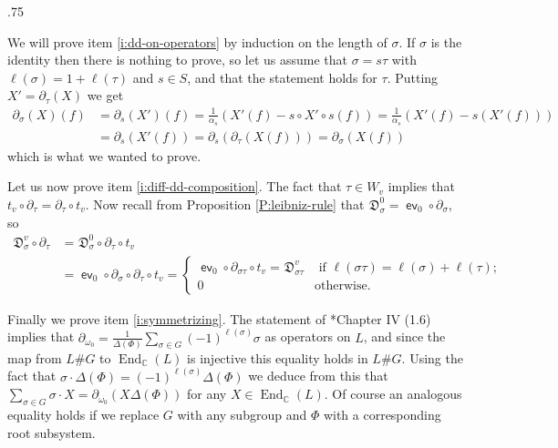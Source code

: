 \documentclass[11pt,fleqn]{amsart}
\makeatletter
\renewcommand\proofname{Proof}
\renewenvironment{proof}[1][\textit{\proofname}]{\par
 \pushQED{\qed}%
 \normalfont \topsep.75\paraskip\relax
 \trivlist
 \item[\hskip\labelsep
 \itshape
 #1\@addpunct{.}]\ignorespaces
}{%
 \popQED\endtrivlist\@endpefalse
}
\newcounter{para}[section]
\newcommand\CC{\mathbb C}
\newcommand\D[3]{{}^{#1} \mathfrak D_{#2}^{#3}}
\DeclareMathOperator\End{End}
\DeclareMathOperator\ev{\mathsf{ev}}
\makeatother
\begin{document}
\begin{proof}
We will prove item \ref{i:dd-on-operators} by induction on the length of 
$\sigma$. If $\sigma$ is the identity then there is nothing to prove, so let
us assume that $\sigma = s \tau$ with $\ell(\sigma) = 1 + \ell(\tau)$ and 
$s \in S$, and that the statement holds for $\tau$. Putting $X' = 
\partial_\tau(X)$ we get
\begin{align*}
\partial_\sigma(X) (f)
	&= \partial_s(X')(f)
	= \frac{1}{\alpha_s} (X'(f) - s\circ X' \circ s (f)) 
	= \frac{1}{\alpha_s} (X'(f) - s(X'(f)))\\
	&= \partial_s(X'(f))
	= \partial_s(\partial_\tau(X(f)))
	= \partial_\sigma(X(f))
\end{align*} 
which is what we wanted to prove.

Let us now prove item \ref{i:diff-dd-composition}. The fact that $\tau \in W_v$
implies that $t_v \circ \partial_\tau = \partial_\tau \circ t_v$. Now recall
from Proposition \ref{P:leibniz-rule} that $\D{}{\sigma}{0} = \ev_0 \circ 
\partial_\sigma$, so 
\begin{align*}
\D{}{\sigma}{v} \circ \partial_\tau 
	&= \D{}{\sigma}{0} \circ \partial_\tau \circ t_v \\
	&= \ev_0 \circ \partial_\sigma \circ \partial_\tau \circ t_v
	= \begin{cases}
		\ev_0 \circ \partial_{\sigma\tau} \circ t_v = \D{}{\sigma\tau}{v}
			& \mbox{ if } \ell(\sigma \tau) = \ell(\sigma) + \ell(\tau); \\
		0 & \mbox{otherwise}.
	\end{cases}
\end{align*}

Finally we prove item \ref{i:symmetrizing}.
The statement of \cite{Hiller-coxeter-book}*{Chapter IV (1.6)} implies that
$\partial_{\omega_0} = \frac{1}{\Delta(\Phi)} \sum_{\sigma \in G} 
(-1)^{\ell(\sigma)} \sigma$ as operators on $L$, and since the map from $L \# 
G$ to $\End_\CC(L)$ is injective this equality holds in $L \# G$. Using the 
fact that $\sigma \cdot \Delta(\Phi) = (-1)^{\ell(\sigma)} \Delta(\Phi)$ we 
deduce from this that $\sum_{\sigma \in G} \sigma \cdot X = \partial_{\omega_0}
(X \Delta(\Phi))$ for any $X \in \End_\CC(L)$. Of course an analogous equality 
holds if we replace $G$ with any subgroup and $\Phi$ with a corresponding root 
subsystem.


\end{proof}
\end{document}
